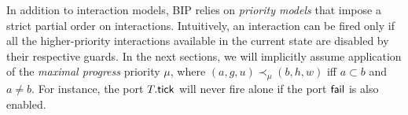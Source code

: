 \documentclass{llncs}
\newcommand{\Simon}{\\\hfill\mdash Simon}
\newcommand{\noteSB}[2][color=green!40, size=\tiny]{\todo[#1]{{#2}\Simon}}
\newcommand{\todoSB}[2][color=green!40, size=\tiny]{\todo[#1]{\textbf{To-do Simon:} {#2}}}
\newcommand{\todoSBin}[2][inline,color=green!40]{\todo[#1]{\textbf{To-do Simon: } {#2}}}
\newcommand{\fig}[1]{Fig.~\ref{fig:#1}}
\newcommand{\secn}[1]{Sect.~\ref{secn:#1}}
\newcommand{\app}[1]{App.~\ref{secn:#1}}
\newcommand{\mdash}[1][]{---#1}
\newcommand{\goesto}[2][]{\ensuremath{\xrightarrow[{#1}\relax]{#2}}}
\newcommand{\twosynch}{%
  \mbox{\ensuremath{\bullet\!\!\!-\!\!\!-\!\!\!-\!\!\!\bullet}}}
\begin{document}



In addition to interaction models, BIP relies on 
  \emph{priority models} that impose  a strict partial order on
  interactions.  %
  Intuitively, an interaction can be fired only if all
  the higher-priority interactions available in the current state are
  disabled by their respective guards.
%
In the next sections, we will implicitly assume application of the  \emph{maximal
  progress} priority $\mu$, where $(a, g, u) \prec_\mu (b, h, w)$ iff  $a \subset b$ and $a \neq b$.  For instance, the
port $T.\mathsf{tick}$ will never fire alone if the port $\mathsf{fail}$ is also enabled.



\end{document}
